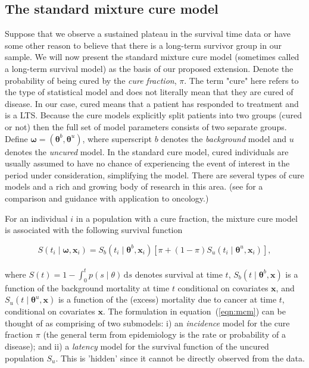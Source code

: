 \documentclass[AMA,STIX1COL]{WileyNJD-v2}
\begin{document}
\subsection{The standard mixture cure model} \label{sec:basic_model}
Suppose that we observe a sustained plateau in the survival time data or have some other reason to believe that there is a long-term survivor group in our sample. We will now present the standard mixture cure model (sometimes called a long-term survival model) as the basis of our proposed extension.
Denote the probability of being cured by the {\it cure fraction}, $\pi$.
The term "cure" here refers to the type of statistical model and does not literally mean that they are cured of disease. In our case, cured means that a patient has responded to treatment and is a LTS.
Because the cure models explicitly split patients into two groups (cured or not) then the full set of model parameters consists of two separate groups. Define $\bm\omega = (\bm\theta^b, \bm\theta^u)$, where superscript $b$ denotes the \textit{background} model and $u$ denotes the \textit{uncured} model. In the standard cure model, cured individuals are usually assumed to have no chance of experiencing the event of interest in the period under consideration, simplifying the model. There are several types of cure models and a rich and growing body of research in this area. (see \citep{Yu2013} for a comparison and guidance with application to oncology.)

For an individual $i$ in a population with a cure fraction, the mixture cure model is associated with the following survival function

\begin{equation}
\label{eqn:mcm}
S(t_{i} \mid \bm\omega, \bm{x}_i) = S_b(t_{i} \mid \bm\theta^b, \bm{x}_{i}) \left[\pi + (1 - \pi) S_u(t_{i} \mid \bm\theta^u, \bm{x}_{i}) \right],
\end{equation}
\\
\noindent
where $S(t) = 1 \!-\! \int_0^t p(s \mid \theta)\, \text{d}s$ denotes survival at time $t$,
$S_b(t \mid \bm\theta^b, \bm{x})$ is a function of the background mortality at time $t$ conditional on covariates $\bm{x}$,
and $S_u(t \mid \bm\theta^u, \bm{x})$ is a function of the (excess) mortality due to cancer at time $t$, conditional on covariates $\bm{x}$. The formulation in equation~(\ref{eqn:mcm}) can be thought of as comprising of two submodels: i) an \textit{incidence} model for the cure fraction $\pi$ (the general term from epidemiology is the rate or probability of a disease); and ii) a \textit{latency} model for the survival function of the uncured population $S_u$. This is 'hidden' since it cannot be directly observed from the data.
\end{document}
